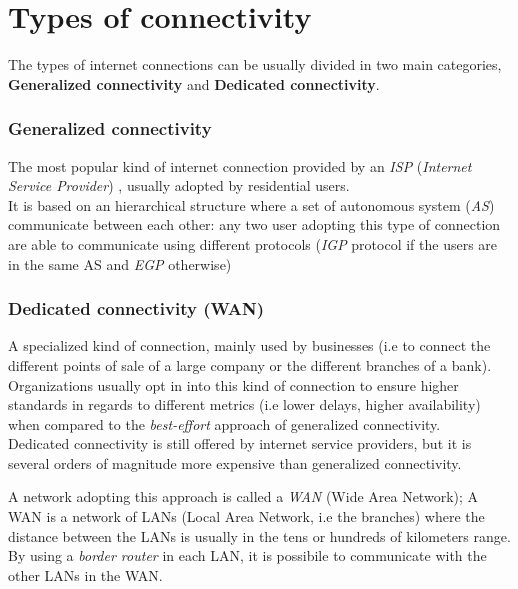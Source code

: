 \section{Types of connectivity}

The types of internet connections can be usually divided in two main categories, \textbf{Generalized connectivity} and \textbf{Dedicated connectivity}.

\subsubsection{Generalized connectivity}

The most popular kind of internet connection provided by an \textit{ISP} (\textit{Internet Service Provider}) , usually adopted by residential users. \\
It is based on an hierarchical structure where a set of autonomous system (\textit{AS}) communicate between each other: any two user adopting this type of connection are able to communicate using different protocols (\textit{IGP} protocol if the users are in the same AS and  \textit{EGP} otherwise)

\subsubsection{Dedicated connectivity (WAN)}

A specialized kind of connection, mainly used by businesses (i.e to connect the different points of sale of a large company or the different branches of a bank). \\

Organizations usually opt in into this kind of connection to ensure  higher standards in regards to different metrics (i.e lower delays, higher availability) when compared to the \textit{best-effort} approach of generalized connectivity. \\

Dedicated connectivity is still offered by internet service providers, but it is several orders of magnitude more expensive than generalized connectivity.

A network adopting this approach is called a \textit{WAN} (Wide Area Network);
A WAN is a network of LANs (Local Area Network, i.e the branches) where the distance between the LANs is usually in the tens or hundreds of kilometers range. \\
By using a \textit{border router} in each LAN, it is possibile to communicate with the other LANs in the WAN.

